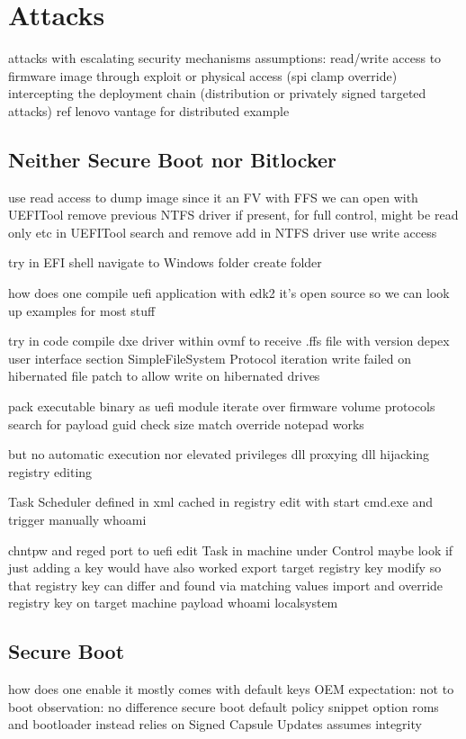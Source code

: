 
\chapter{Attacks}

attacks with escalating security mechanisms
assumptions:
read/write access to firmware image through
exploit or physical access (spi clamp override)
intercepting the deployment chain (distribution or privately signed targeted attacks)
ref lenovo vantage for distributed example



\section{Neither Secure Boot nor Bitlocker}
use read access to dump image
since it an FV with FFS we can open with UEFITool
remove previous NTFS driver if present, for full control, might be read only etc
in UEFITool search and remove
add in NTFS driver
use write access

try in EFI shell
navigate to Windows folder
create folder

how does one compile uefi application with edk2
it's open source so we can look up examples for most stuff

try in code
compile dxe driver within ovmf to receive .ffs file with version depex user interface section
SimpleFileSystem Protocol iteration
write failed on hibernated file
patch to allow write on hibernated drives

pack executable binary as uefi module
iterate over firmware volume protocols
search for payload guid
check size match
override notepad works

but no automatic execution nor elevated privileges
dll proxying
dll hijacking
registry editing

Task Scheduler
defined in xml
cached in registry
edit with start cmd.exe and trigger manually
whoami

chntpw and reged
port to uefi
edit Task in machine under Control
maybe look if just adding a key would have also worked
export target registry key
modify so that registry key can differ and found via matching values
import and override registry key on target machine
payload whoami
localsystem


\section{Secure Boot}
how does one enable it
mostly comes with default keys OEM
expectation:
not to boot
observation:
no difference
secure boot default policy snippet
option roms and bootloader
instead relies on Signed Capsule Updates
assumes integrity


